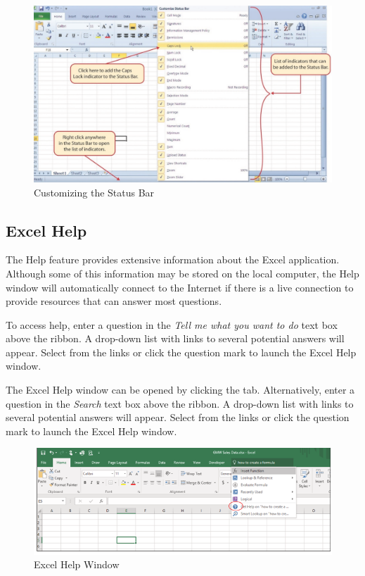 \begin{figure}[H]
	\centering
	\includegraphics[width=\maxwidth{.95\linewidth}]{gfx/ch01_fig13}
	\caption{Customizing the Status Bar}
	\label{01:fig13}
\end{figure}

\subsection{Excel Help}

The Help feature provides extensive information about the Excel application. Although some of this information may be stored on the local computer, the Help window will automatically connect to the Internet if there is a live connection to provide resources that can answer most questions. 

 To access help, enter a question in the \textit{Tell me what you want to do} text box above the ribbon. A drop-down list with links to several potential answers will appear. Select from the links or click the question mark to launch the Excel Help window.

 The Excel Help window can be opened by clicking the  tab. Alternatively, enter a question in the \textit{Search} text box above the ribbon. A drop-down list with links to several potential answers will appear. Select from the links or click the question mark to launch the Excel Help window.

\begin{figure}[H]
	\centering
	\includegraphics[width=\maxwidth{.95\linewidth}]{gfx/ch01_fig14}
	\caption{Excel Help Window}
	\label{01:fig14}
\end{figure}

